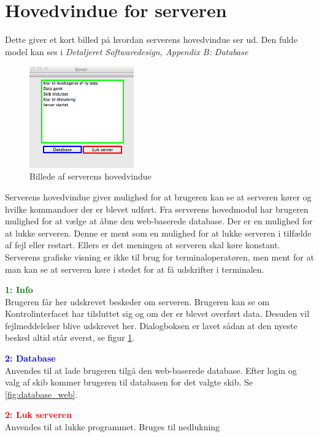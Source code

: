 \section*{Hovedvindue for serveren}
Dette giver et kort billed på hvordan serverens hovedvindue ser ud. Den fulde model kan ses i  \textit{Detaljeret Softwaredesign, Appendix B: Database}
\begin{figure}[htbp]
	\centering
	\includegraphics[width=0.4\textwidth]{billeder/server}
	\caption{Billede af serverens hovedvindue}
	\label{fig:server}
\end{figure}
Serverens hovedvindue giver mulighed for at brugeren kan se at serveren kører og hvilke kommandoer der er blevet udført. Fra serverens hovedmodul har brugeren mulighed for at vælge at åbne den web-baserede database. Der er en mulighed for at lukke serveren. Denne er ment som en mulighed for at lukke serveren i tilfælde af fejl eller restart. Ellers er det meningen at serveren skal køre konstant. Serverens grafiske visning er ikke til brug for terminaloperatøren, men ment for at man kan se at serveren køre i stedet for at få udskrifter i terminalen.

\textcolor{green}{\textbf{1: Info}}\\
Brugeren får her udskrevet beskeder om serveren. Brugeren kan se om Kontrolinterfacet har tilsluttet sig og om der er blevet overført data. Desuden vil fejlmeddelelser blive udskrevet her. Dialogboksen er lavet sådan at den nyeste besked altid står øverst, se figur \ref{fig:server}.

\textcolor{blue}{\textbf{2: Database}}\\
Anvendes til at lade brugeren tilgå den web-baserede database. Efter login og valg af skib kommer brugeren til databasen for det valgte skib. Se \ref{fig:database_web}.

\textcolor{red}{\textbf{2: Luk serveren}}\\
Anvendes til at lukke programmet. Bruges til nedlukning\\


